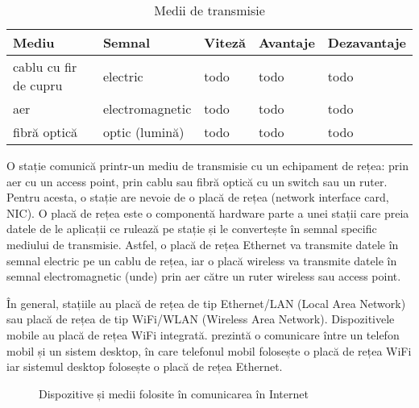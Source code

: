 \begin{table}[!htb]
  \caption{Medii de transmisie}
  \begin{center}
    \begin{tabular}{ p{} p{} p{} p{} p{} }
      \toprule
        \textbf{Mediu} &
        \textbf{Semnal} &
        \textbf{Viteză} &
        \textbf{Avantaje} &
        \textbf{Dezavantaje} \\
      \midrule
        cablu cu fir de cupru &
        electric &
        todo &
        todo &
        todo \\

        aer &
        electromagnetic &
        todo &
        todo &
        todo \\

        fibră optică &
        optic (lumină) &
        todo &
        todo &
        todo \\
      \bottomrule
    \end{tabular}
    \label{tab:net:media}
  \end{center}
\end{table}

O stație comunică printr-un mediu de transmisie cu un echipament de rețea: prin aer cu un access point, prin cablu sau fibră optică cu un switch sau un ruter. Pentru acesta, o stație are nevoie de o placă de rețea (network interface card, NIC). O placă de rețea este o componentă hardware parte a unei stații care preia datele de le aplicații ce rulează pe stație și le convertește în semnal specific mediului de transmisie. Astfel, o placă de rețea Ethernet va transmite datele în semnal electric pe un cablu de rețea, iar o placă wireless va transmite datele în semnal electromagnetic (unde) prin aer către un ruter wireless sau access point.

În general, stațiile au placă de rețea de tip Ethernet/LAN (Local Area Network) sau placă de rețea de tip WiFi/WLAN (Wireless Area Network). Dispozitivele mobile au placă de rețea WiFi integrată.  prezintă o comunicare între un telefon mobil și un sistem desktop, în care telefonul mobil folosește o placă de rețea WiFi iar sistemul desktop folosește o placă de rețea Ethernet.

\begin{figure}[htbp]
  \centering
  \def\svgwidth{\columnwidth}
  
  \caption{Dispozitive și medii folosite în comunicarea în Internet}
  \label{fig:net:connect}
\end{figure}

